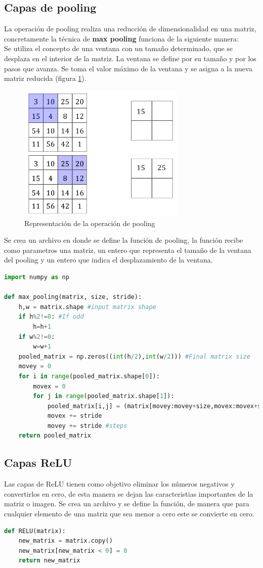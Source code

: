\documentclass{article}
\begin{document}
\subsection{Capas de pooling}
La operación de pooling realiza una reducción de dimensionalidad en una matriz, concretamente la técnica de \textbf{max pooling} funciona de la siguiente manera: \\
Se utiliza el concepto de una ventana con un tamaño determinado, que se desplaza en el interior de la matriz. La ventana se define por su tamaño y por los pasos que avanza.
Se toma el valor máximo de la ventana y se asigna a la nueva matriz reducida (figura \ref{pooling}).
\begin{figure}[H]
    \centering
    \includegraphics[width=80mm]{pooling.png}
    \caption{Representación de la operación de pooling}
    \label{pooling}
\end{figure} 
Se crea un archivo en donde se define la función de pooling, la función recibe como parametros una matriz, un entero que representa el tamaño de la ventana del pooling y un entero
que indica el desplazamiento de la ventana. 
\begin{lstlisting}[language=python]
import numpy as np 

def max_pooling(matrix, size, stride):
    h,w = matrix.shape #input matrix shape
    if h%2!=0: #If odd
        h=h+1
    if w%2!=0:
        w=w+1
    pooled_matrix = np.zeros((int(h/2),int(w/2))) #Final matrix size
    movey = 0
    for i in range(pooled_matrix.shape[0]):
        movex = 0
        for j in range(pooled_matrix.shape[1]):
            pooled_matrix[i,j] = (matrix[movey:movey+size,movex:movex+size]).max() #Check for maximum value
            movex += stride
            movey += stride #steps
    return pooled_matrix
\end{lstlisting}
\subsection{Capas ReLU}
Las capas de ReLU tienen como objetivo eliminar los números negativos y convertirlos en cero, de esta manera se dejan las caracteristias importantes de la matriz o imagen. Se crea un archivo y se define la función, de manera que
para cualquier elemento de una matriz que sea menor a cero este se convierte en cero. 
\begin{lstlisting}[language=python]
def RELU(matrix):
    new_matrix = matrix.copy()
    new_matrix[new_matrix < 0] = 0
    return new_matrix
\end{lstlisting}
\end{document}
